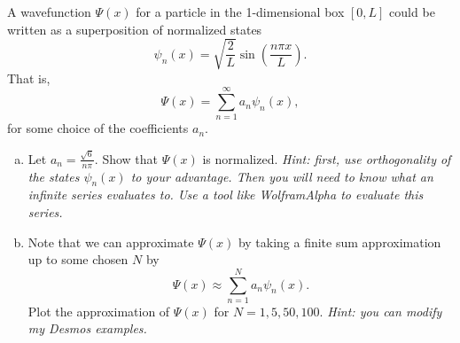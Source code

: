 \documentclass[12pt]{article} %
\begin{document}
\newpage
\begin{problem}
	A wavefunction $\Psi(x)$ for a particle in the 1-dimensional box $[0,L]$ could be written as a superposition of normalized states
	\[
	\psi_n(x) = \sqrt{\frac{2}{L}} \sin\left(\frac{n\pi x}{L}\right).
	\]
	That is,
	\[
	\Psi(x) = \sum_{n=1}^\infty a_n \psi_n(x),
	\]
	for some choice of the coefficients $a_n$.
	\begin{enumerate}[(a)]
		\item Let $a_n = \frac{\sqrt{6}}{n\pi}$. Show that $\Psi(x)$ is normalized. \emph{Hint: first, use orthogonality of the states $\psi_n(x)$ to your advantage. Then you will need to know what an infinite series evaluates to. Use a tool like WolframAlpha to evaluate this series.}
		\item Note that we can approximate $\Psi(x)$ by taking a finite sum approximation up to some chosen $N$ by
		\[
			\Psi(x) \approx \sum_{n=1}^N a_n \psi_n(x).
		\]
		Plot the approximation of $\Psi(x)$ for $N=1,5,50,100$.  \emph{Hint: you can modify my Desmos examples.}
		\end{enumerate}
\end{problem}
\end{document}
